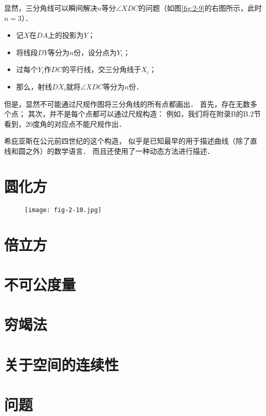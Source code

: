 \documentclass[cn,fancy,blue,11pt]{elegantbook}
\begin{document}
显然，三分角线可以瞬间解决$n$等分$\angle XDC$的问题（如图\ref{fig:2-9}的右图所示，此时$n=3$）．
\begin{itemize}
	\item 记$X$在$DA$上的投影为$Y$；
	\item 将线段$DY$等分为$n$份，设分点为$Y_i$；
	\item 过每个$Y_i$作$DC$的平行线，交三分角线于$X_i$；
	\item 那么，射线$DX_i$就将$\angle XDC$等分为$n$份．
\end{itemize}

但是，显然不可能通过尺规作图将三分角线的所有点都画出．
首先，存在无数多个点；
其次，并不是每个点都可以通过尺规构造：
例如，我们将在附录B的B.2节看到，20度角的对应点不能尺规作出．

希庇亚斯在公元前四世纪的这个构造，
似乎是已知最早的用于描述曲线（除了直线和圆之外）的数学语言．
而且还使用了一种动态方法进行描述．




\section{圆化方}

\begin{figure}[htbp]
	\centering
	\texttt{[image: fig-2-10.jpg]}
	\caption{\label{fig:2-10}}
\end{figure}



\section{倍立方}

\section{不可公度量}

\section{穷竭法}

\section{关于空间的连续性}

\section{问题}
\end{document}
